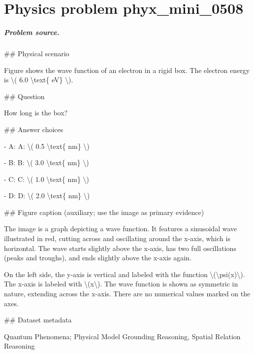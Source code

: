
\chapter{Physics problem phyx\_mini\_0508}
\label{ch:PhyXMiniProblems_problem_phyx_mini_0508}

\paragraph{Problem source.}
\#\# Physical scenario

Figure shows the wave function of an electron in a rigid box. The electron energy is \textbackslash{}( 6.0 \textbackslash{}text\{ eV\} \textbackslash{}).

\#\# Question

How long is the box?

\#\# Answer choices

- A: A: \textbackslash{}( 0.5 \textbackslash{}text\{ nm\} \textbackslash{})

- B: B: \textbackslash{}( 3.0 \textbackslash{}text\{ nm\} \textbackslash{})

- C: C: \textbackslash{}( 1.0 \textbackslash{}text\{ nm\} \textbackslash{})

- D: D: \textbackslash{}( 2.0 \textbackslash{}text\{ nm\} \textbackslash{})

\#\# Figure caption (auxiliary; use the image as primary evidence)

The image is a graph depicting a wave function. It features a sinusoidal wave illustrated in red, cutting across and oscillating around the x-axis, which is horizontal. The wave starts slightly above the x-axis, has two full oscillations (peaks and troughs), and ends slightly above the x-axis again.

On the left side, the y-axis is vertical and labeled with the function \textbackslash{}(\textbackslash{}psi(x)\textbackslash{}). The x-axis is labeled with \textbackslash{}(x\textbackslash{}). The wave function is shown as symmetric in nature, extending across the x-axis. There are no numerical values marked on the axes.

\#\# Dataset metadata

Quantum Phenomena; Physical Model Grounding Reasoning, Spatial Relation Reasoning

